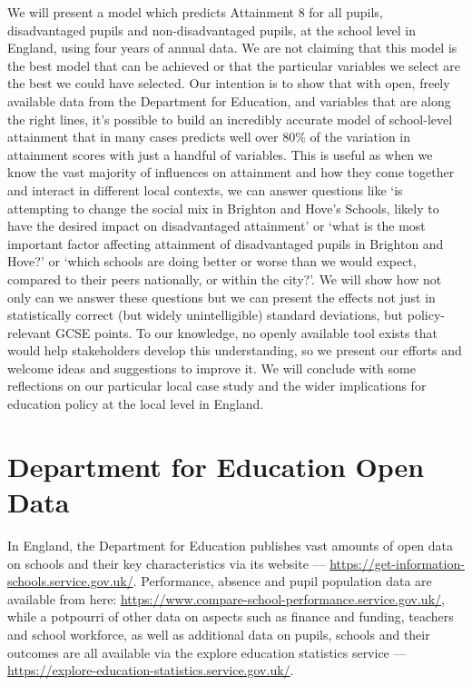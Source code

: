 \documentclass[
  11pt,
]{article}
\begin{document}
We will present a model which predicts Attainment 8 for all pupils,
disadvantaged pupils and non-disadvantaged pupils, at the school level
in England, using four years of annual data. We are not claiming that
this model is the best model that can be achieved or that the particular
variables we select are the best we could have selected. Our intention
is to show that with open, freely available data from the Department for
Education, and variables that are along the right lines, it's possible
to build an incredibly accurate model of school-level attainment that in
many cases predicts well over 80\% of the variation in attainment scores
with just a handful of variables. This is useful as when we know the
vast majority of influences on attainment and how they come together and
interact in different local contexts, we can answer questions like `is
attempting to change the social mix in Brighton and Hove's Schools,
likely to have the desired impact on disadvantaged attainment' or `what
is the most important factor affecting attainment of disadvantaged
pupils in Brighton and Hove?' or `which schools are doing better or
worse than we would expect, compared to their peers nationally, or
within the city?'. We will show how not only can we answer these
questions but we can present the effects not just in statistically
correct (but widely unintelligible) standard deviations, but
policy-relevant GCSE points. To our knowledge, no openly available tool
exists that would help stakeholders develop this understanding, so we
present our efforts and welcome ideas and suggestions to improve it. We
will conclude with some reflections on our particular local case study
and the wider implications for education policy at the local level in
England.

\section{Department for Education Open
Data}\label{department-for-education-open-data}

In England, the Department for Education publishes vast amounts of open
data on schools and their key characteristics via its website ---
\url{https://get-information-schools.service.gov.uk/}. Performance,
absence and pupil population data are available from here:
\url{https://www.compare-school-performance.service.gov.uk/}, while a
potpourri of other data on aspects such as finance and funding, teachers
and school workforce, as well as additional data on pupils, schools and
their outcomes are all available via the explore education statistics
service --- \url{https://explore-education-statistics.service.gov.uk/}.
\end{document}
